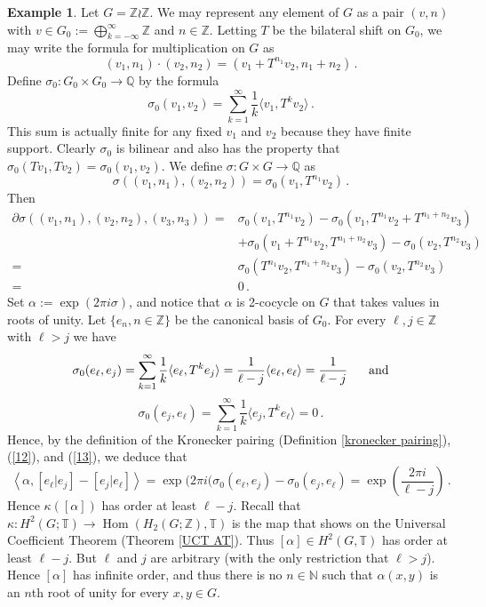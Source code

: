 \documentclass{amsart}
\theoremstyle{definition}
\newtheorem{example}[theorem]{Example}
\newcommand{\Z}{\mathbb{Z}}
\newcommand{\Q}{\mathbb{Q}}
\newcommand{\N}{\mathbb{N}}
\newcommand{\TT}{\mathbb{T}}
\DeclareMathOperator{\Hom}{Hom}
\begin{document}
\begin{example}
Let $G=\Z\wr\Z$. We may represent any element of $G$ as a pair $(v,n)$ with $v\in G_0:=\bigoplus_{k=-\infty}^\infty\Z$ and $n\in\Z$. Letting $T$ be the bilateral shift on $G_0$, we may write the formula for multiplication on $G$ as
$$(v_1,n_1)\cdot(v_2,n_2)=(v_1+T^{n_1}v_2,n_1+n_2)\,.$$
Define $\sigma_0 \colon G_0\times G_0\rightarrow\Q$ by the formula
$$\sigma_0(v_1,v_2)=\sum_{k=1}^\infty\frac1k\langle v_1,T^kv_2\rangle\,.$$
This sum is actually finite for any fixed $v_1$ and $v_2$ because they have finite support. Clearly $\sigma_0$ is bilinear and also has the property that $\sigma_0(Tv_1,Tv_2)=\sigma_0(v_1,v_2)$. We define $\sigma \colon G\times G\rightarrow\Q$ as
$$\sigma((v_1,n_1),(v_2,n_2))=\sigma_0(v_1,T^{n_1}v_2)\,.$$
Then
\begin{align*}
\partial\sigma((v_1,n_1),(v_2,n_2),(v_3,n_3))=&\sigma_0(v_1,T^{n_1}v_2)-\sigma_0(v_1,T^{n_1}v_2+T^{n_1+n_2}v_3)\\
&+\sigma_0(v_1+T^{n_1}v_2,T^{n_1+n_2}v_3)-\sigma_0(v_2,T^{n_2}v_3)\\
=&\sigma_0(T^{n_1}v_2,T^{n_1+n_2}v_3)-\sigma_0(v_2,T^{n_2}v_3)\\
=&0\,.
\end{align*}
Set $\alpha:=\exp(2\pi i\sigma)$, and notice that $\alpha$ is 2-cocycle on $G$ that takes values in roots of unity. Let $\{e_n,n\in \Z\}$ be the canonical basis of $G_0$. For every $\ell,j\in \Z$ with $\ell>j$ we have
\begin{equation}\label{12}
    \sigma_0(e_{\ell},e_j)=\sum_{k=1}^\infty\frac1k\langle e_{\ell},T^ke_j\rangle=\frac{1}{\ell-j}\langle e_{\ell},e_{\ell} \rangle=\frac{1}{\ell-j}  \hspace{6mm} \text{and}
\end{equation}
\begin{equation}\label{13}
\sigma_0(e_j,e_{\ell})=\sum_{k=1}^\infty\frac1k\langle e_j,T^ke_{\ell}\rangle=0\,.    
\end{equation}
Hence, by the definition of the Kronecker pairing (Definition \ref{kronecker pairing}), (\ref{12}), and (\ref{13}), we deduce that
\begin{equation}\label{14}
  \left\langle\alpha,[e_{\ell}|e_j]-[e_j|e_{\ell}]\right\rangle=\exp(2\pi i(\sigma_0(e_{\ell},e_j)-\sigma_0(e_j,e_{\ell})=\exp(\frac{2\pi i}{\ell-j}) \,.
\end{equation}
Hence $\kappa([\alpha])$ has order at least $\ell-j$. Recall that $\kappa\colon H^2(G;\TT)\rightarrow \Hom(H_2(G;\Z),\TT)$ is the map that shows on the Universal Coefficient Theorem (Theorem \ref{UCT AT}). Thus $[\alpha]\in H^2(G,\TT)$ has order at least $\ell-j$. But $\ell$ and $j$ are arbitrary (with the only restriction that $\ell>j$). Hence $[\alpha]$ has infinite order, and thus there is no $n\in \N$ such that $\alpha(x,y)$ is an $n$th root of unity for every $x,y\in G$.

\end{example}
\end{document}
